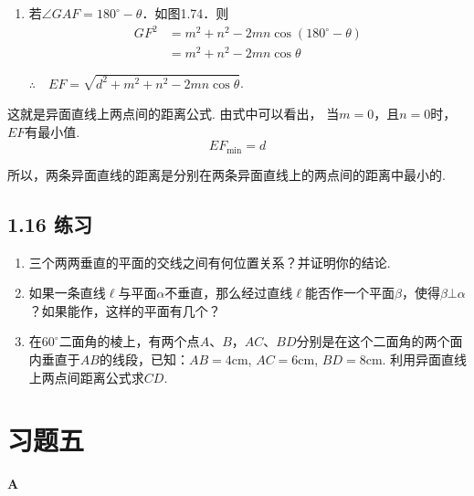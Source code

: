 \begin{solution}
\begin{enumerate}[(1)]
\begin{minipage}{.45\textwidth}
\end{minipage}

\item 若$\angle GAF=180^{\circ}-\theta$．如图1.74．则
\[\begin{split}
    GF^2&=m^2+n^2-2mn\cos(180^{\circ}-\theta)\\
    &=m^2+n^2-2mn\cos\theta
\end{split}\]

$\therefore\quad EF=\sqrt{d^2+m^2+n^2-2mn\cos\theta}$.
\end{enumerate}

这就是异面直线上两点间的距离公式. 由式中可以看出，
当$m=0$，且$n=0$时，$EF$有最小值.
$$EF_{\min}=d$$

所以，两条异面直线的距离是分别在两条异面直线上的两点间的距离中最小的.
\end{solution}

\subsection*{1.16 练习}
\begin{enumerate}
\item 三个两两垂直的平面的交线之间有何位置关系？并证明你的结论.
\item 如果一条直线$\ell$与平面$\alpha$不垂直，那么经过直线$\ell$能否作一个平面$\beta$，使得$\beta\bot\alpha$？如果能作，这样的平面有几个？
\item 在$60^{\circ}$二面角的棱上，有两个点$A$、$B$，$AC$、$BD$分别是在这个二面角的两个面内垂直于$AB$的线段，已知：$AB=4$cm, $AC=6$cm, $BD=8$cm. 利用异面直线上两点间距离公式求$CD$.
\end{enumerate}

\section*{习题五}
\begin{center}
    \bfseries A
\end{center}

